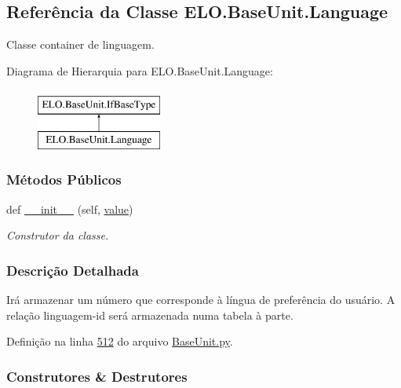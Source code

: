 \hypertarget{classELO_1_1BaseUnit_1_1Language}{}\subsection{Referência da Classe E\+L\+O.\+Base\+Unit.\+Language}
\label{classELO_1_1BaseUnit_1_1Language}


Classe container de linguagem.  


Diagrama de Hierarquia para E\+L\+O.\+Base\+Unit.\+Language\+:\begin{figure}[H]
\begin{center}
\leavevmode
\includegraphics[height=2.000000cm]{d2/d3e/classELO_1_1BaseUnit_1_1Language}
\end{center}
\end{figure}
\subsubsection*{Métodos Públicos}
\begin{DoxyCompactItemize}
\item 
def \hyperlink{classELO_1_1BaseUnit_1_1Language_a14a17f80e86f12e135cb33d05efbf502}{\+\_\+\+\_\+init\+\_\+\+\_\+} (self, \hyperlink{classELO_1_1BaseUnit_1_1IfBaseType_a2534c3548a8e5991dde0a64b4f0b542b}{value})
\begin{DoxyCompactList}\small\item\em Construtor da classe. \end{DoxyCompactList}\end{DoxyCompactItemize}


\subsubsection{Descrição Detalhada}
Irá armazenar um número que corresponde à língua de preferência do usuário. A relação linguagem-\/id será armazenada numa tabela à parte. 

Definição na linha \hyperlink{BaseUnit_8py_source_l00512}{512} do arquivo \hyperlink{BaseUnit_8py_source}{Base\+Unit.\+py}.



\subsubsection{Construtores \& Destrutores}
\hypertarget{classELO_1_1BaseUnit_1_1Language_a14a17f80e86f12e135cb33d05efbf502}{}
